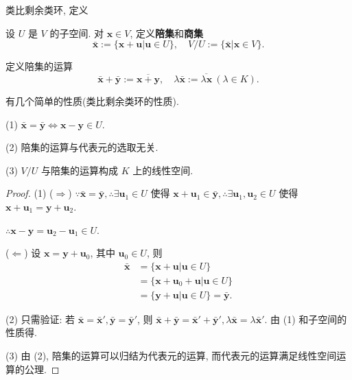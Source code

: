 \documentclass[color=black,device=normal,lang=cn,mode=geye]{elegantnote}
\begin{document}
类比剩余类环, 定义
\begin{definition}
    设 $U$ 是 $V$ 的子空间. 对 $\boldsymbol{x}\in V$, 定义\textbf{陪集}和\textbf{商集}
    \[\bar{\boldsymbol{x}}:=\{\boldsymbol{x}+\boldsymbol{u}|\boldsymbol{u}\in U\},\quad V/U:=\{\bar{\boldsymbol{x}}|\boldsymbol{x}\in V\}.\]

    定义陪集的运算
    \[\bar{\boldsymbol{x}}+\bar{\boldsymbol{y}}:=\overline{\boldsymbol{x}+\boldsymbol{y}},\quad\lambda\bar{\boldsymbol{x}}:=\overline{\lambda\boldsymbol{x}}\ (\lambda\in K).\]
\end{definition}
有几个简单的性质(类比剩余类环的性质).
\begin{property}\label{p1.3}
    (1) $\bar{\boldsymbol{x}}=\bar{\boldsymbol{y}}\Leftrightarrow\boldsymbol{x}-\boldsymbol{y}\in U$.

    (2) 陪集的运算与代表元的选取无关.

    (3) $V/U$ 与陪集的运算构成 $K$ 上的线性空间.
\end{property}
\begin{proof}
    (1) ($\Rightarrow$) $\because\bar{\boldsymbol{x}}=\bar{\boldsymbol{y}},\therefore\exists\boldsymbol{u}_1\in U$ 使得 $\boldsymbol{x}+\boldsymbol{u}_1\in\bar{\boldsymbol{y}},\therefore\exists\boldsymbol{u}_1,\boldsymbol{u}_2\in U$ 使得 $\boldsymbol{x}+\boldsymbol{u}_1=\boldsymbol{y}+\boldsymbol{u}_2$.

    $\therefore\boldsymbol{x}-\boldsymbol{y}=\boldsymbol{u}_2-\boldsymbol{u}_1\in U$.

    ($\Leftarrow$) 设 $\boldsymbol{x}=\boldsymbol{y}+\boldsymbol{u}_0$, 其中 $\boldsymbol{u}_0\in U$, 则
    \begin{align*}
        \bar{\boldsymbol{x}} & =\{\boldsymbol{x}+\boldsymbol{u}|\boldsymbol{u}\in U\} \\
        & =\{\boldsymbol{x}+\boldsymbol{u}_0+\boldsymbol{u}|\boldsymbol{u}\in U\} \\
        & =\{\boldsymbol{y}+\boldsymbol{u}|\boldsymbol{u}\in U\}=\bar{\boldsymbol{y}}.
    \end{align*}

    (2) 只需验证: 若 $\bar{\boldsymbol{x}}=\bar{\boldsymbol{x}}',\bar{\boldsymbol{y}}=\bar{\boldsymbol{y}}'$, 则 $\bar{\boldsymbol{x}}+\bar{\boldsymbol{y}}=\bar{\boldsymbol{x}}'+\bar{\boldsymbol{y}}',\lambda\bar{\boldsymbol{x}}=\lambda\bar{\boldsymbol{x}}'$. 由 (1) 和子空间的性质得.

    (3) 由 (2), 陪集的运算可以归结为代表元的运算, 而代表元的运算满足线性空间运算的公理.
\end{proof}
\end{document}
